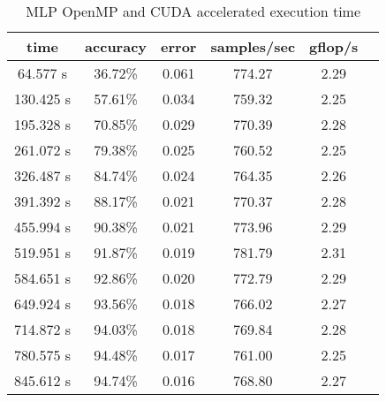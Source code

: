 \documentclass[11pt]{article}
\begin{document}
\begin{table}[h]	\centering
	\begin{tabular}{|c|c|c|c|c|c|}
		\hline
		\textbf{time} & \textbf{accuracy} & \textbf{error} & \textbf{samples/sec} & \textbf{gflop/s} \\ \hline
		64.577 s      & 36.72\%           & 0.061          & 774.27               & 2.29             \\ \hline
		130.425 s     & 57.61\%           & 0.034          & 759.32               & 2.25             \\ \hline
		195.328 s     & 70.85\%           & 0.029          & 770.39               & 2.28             \\ \hline
		261.072 s     & 79.38\%           & 0.025          & 760.52               & 2.25             \\ \hline
		326.487 s     & 84.74\%           & 0.024          & 764.35               & 2.26             \\ \hline
		391.392 s     & 88.17\%           & 0.021          & 770.37               & 2.28             \\ \hline
		455.994 s     & 90.38\%           & 0.021          & 773.96               & 2.29             \\ \hline
		519.951 s     & 91.87\%           & 0.019          & 781.79               & 2.31             \\ \hline
		584.651 s     & 92.86\%           & 0.020          & 772.79               & 2.29             \\ \hline
		649.924 s     & 93.56\%           & 0.018          & 766.02               & 2.27             \\ \hline
		714.872 s     & 94.03\%           & 0.018          & 769.84               & 2.28             \\ \hline
		780.575 s     & 94.48\%           & 0.017          & 761.00               & 2.25             \\ \hline
		845.612 s     & 94.74\%           & 0.016          & 768.80               & 2.27             \\ \hline
	\end{tabular}
	\caption{MLP OpenMP and CUDA accelerated execution time}
	\label{tab:mlp_accelerated_cuda}
\end{table}
\end{document}

